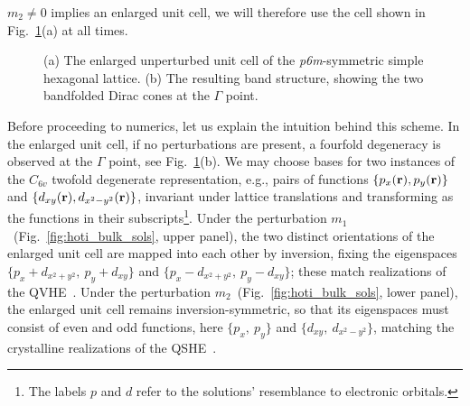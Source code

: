 $m_2 \neq 0$ implies an enlarged unit cell, we will therefore use the cell shown in Fig.~\ref{fig:hoti_folding}(a) at all times.
%
 \begin{figure} [h!]
 	\centering
 	
 	\caption{(a) The enlarged unperturbed unit cell of the \textit{p6m}-symmetric simple hexagonal lattice. (b) The resulting band structure, showing the two bandfolded Dirac cones at the $\Gamma$ point.  }
 	\label{fig:hoti_folding}			
 \end{figure}
 
Before proceeding to numerics, let us explain the intuition behind this scheme. In the enlarged unit cell, if no perturbations are present, a fourfold degeneracy is observed at the $\Gamma$ point, see Fig.~\ref{fig:hoti_folding}(b). We may choose bases for two instances of the $C_{6v}$ twofold degenerate representation, e.g., pairs of functions $\{p_x(\vb{r}), p_y(\vb{r} )\}$ and $\{d_{xy}(\vb{r}), d_{x^2-y^2}(\vb{r})\}$, invariant under lattice translations and transforming as the functions in their subscripts\footnote{The labels $p$ and $d$ refer to the solutions' resemblance to electronic orbitals.}. Under the perturbation $m_1$~(Fig.~\ref{fig:hoti_bulk_sols}, upper panel), the two distinct orientations of the enlarged unit cell are mapped into each other by inversion, fixing the eigenspaces $\{p_x + d_{x^2+y^2}, \: p_y + d_{xy}\}$ and $\{p_x - d_{x^2+y^2}, \: p_y - d_{xy}\}$; these match realizations of the QVHE~\cite{Ma_2016, Lu_2017}. Under the perturbation $m_2$~(Fig.~\ref{fig:hoti_bulk_sols}, lower panel), the enlarged unit cell remains inversion-symmetric, so that its eigenspaces must consist of even and odd functions, here $\{p_x,\: p_y\}$ and $\{d_{xy},\: d_{x^2-y^2}\}$, matching the crystalline realizations of the QSHE~\cite{Wu_Hu_2015}. 

